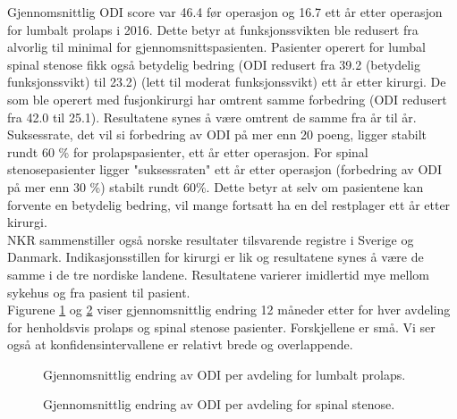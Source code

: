 \documentclass [norsk,a4paper,twoside]{article}\usepackage[]{graphicx}\usepackage[]{color}
\begin{document}
Gjennomsnittlig ODI score var 46.4 før operasjon og 16.7 ett år etter
operasjon for lumbalt prolaps i 2016. Dette betyr at funksjonssvikten ble redusert 
fra alvorlig til minimal for gjennomsnittspasienten. 
Pasienter operert for lumbal spinal stenose fikk også
betydelig bedring (ODI redusert fra 39.2 (betydelig funksjonssvikt) til 23.2) (lett til moderat funksjonssvikt) ett år etter kirurgi. 
De som ble operert med fusjonkirurgi har
omtrent samme forbedring (ODI redusert fra 42.0 til 25.1). Resultatene synes å være omtrent de samme fra år til år. Suksessrate, det vil si forbedring av ODI på mer enn 20 poeng, ligger stabilt rundt 60 \% for prolapspasienter, ett år etter operasjon. 
For spinal stenosepasienter ligger "suksessraten" ett år etter operasjon (forbedring av ODI på mer enn 30 \%) stabilt rundt 60\%.
Dette betyr at selv om
pasientene kan forvente en betydelig bedring, vil mange fortsatt ha en del restplager
ett år etter kirurgi. \\
 
 NKR
sammenstiller også norske resultater tilsvarende registre i Sverige og
Danmark. Indikasjonsstillen for kirurgi er lik og resultatene synes å være de samme i de tre nordiske landene.
Resultatene varierer imidlertid mye mellom sykehus og fra pasient til pasient. \\






      
      Figurene \ref{fig:OswEndrAvdPro} og \ref{fig:OswEndrAvdSS} viser gjennomsnittlig endring 12 måneder etter for hver avdeling for henholdsvis prolaps og spinal stenose pasienter. Forskjellene er små. Vi ser også at konfidensintervallene er relativt brede og overlappende.

\begin{figure}[h] 
\caption{Gjennomsnittlig endring av ODI per avdeling for lumbalt prolaps.}
\label{fig:OswEndrAvdPro}
\end{figure}

\begin{figure}[h] 
\caption{Gjennomsnittlig endring av ODI per avdeling for spinal stenose.}
\label{fig:OswEndrAvdSS}
\end{figure}
\end{document}
